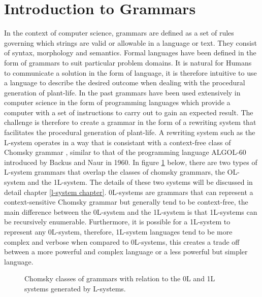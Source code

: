 \section{Introduction to Grammars}

\begin{flushleft}

In the context of computer science, grammars are defined as a set of rules governing which strings are valid or allowable in a language or text. They consist of syntax, morphology and semantics. Formal languages have been defined in the form of grammars to suit particular problem domains. It is natural for Humans to communicate a solution in the form of language, it is therefore intuitive to use a language to describe the desired outcome when dealing with the procedural generation of plant-life. In the past grammars have been used extensively in computer science in the form of programming languages which provide a computer with a set of instructions to carry out to gain an expected result. The challenge is therefore to create a grammar in the form of a rewriting system that facilitates the procedural generation of plant-life. A rewriting system such as the L-system operates in a way that is consistant with a context-free class of Chomsky grammar \cite{chomsky1956three}, similar to that of the programming language ALGOL-60 introduced by Backus and Naur in  1960\cite{backus1960report}. In figure \ref{chomsky grammars} below, there are two types of L-system grammars that overlap the classes of chomsky grammars, the OL-system and the 1L-system. The details of these two systems will be discussed in detail chapter \ref{l-system chapter}. 0L-systems are grammars that can represent a context-sensitive Chomsky grammar but generally tend to be context-free, the main difference between the 0L-system and the 1L-system is that 1L-systems can be recursively enumerable. Furthermore, it is possible for a 1L-system to represent any 0L-system, therefore, 1L-system languages tend to be more complex and verbose when compared to 0L-systems, this creates a trade off between a more powerful and complex language or a less powerful but simpler language. \\

\begin{figure}[htbp]
	{\centering
		\setlength{\fboxrule}{1pt}
		\vspace{7px}
		\caption{Chomsky classes of grammars with relation to the 0L and 1L systems generated by L-systems.} \label{chomsky grammars}
	}
\end{figure}
\FloatBarrier

\end{flushleft}

